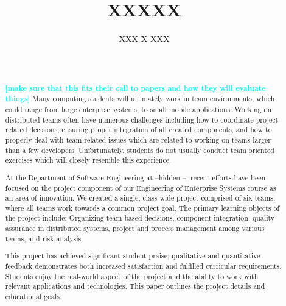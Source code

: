 \documentclass{sig-alternate-05-2015}
\newcommand{\todo}[1]{\textcolor{cyan}{\textbf{[#1]}}}
\newif\ifisnopii
\begin{document}
	
\title{XXXXX}

\ifisnopii %
\author{
\alignauthor
Daniel E. Krutz, and Samuel A. Malachowsky 	\\
	\affaddr{Software Engineering Department}\\
       	\affaddr{Rochester Institute of Technology}\\
	\affaddr{1 Lomb Memorial Drive}\\
	\affaddr{Rochester, NY, USA}\\
       \email{\{dxkvse,samvse\}@rit.edu}
       \alignauthor
} %
\else %
\author{
\alignauthor
XXX X XXX\\
       \\
       \\
}
\fi %





\maketitle
\begin{abstract}

\todo{make sure that this fits their call to papers and how they will evaluate things}
Many computing students will ultimately work in team environments, which could range from large enterprise systems, to small mobile applications. Working on distributed teams often have numerous challenges including how to coordinate project related decisions, ensuring proper integration of all created components, and how to properly deal with team related issues which are related to working on teams larger than a few developers. Unfortunately, students do not usually conduct team oriented exercises which will closely resemble this experience.

At the Department of Software Engineering at \ifisnopii the Rochester Institute of Technology (RIT)\else --hidden --\fi, recent efforts have been focused on the project component of our Engineering of Enterprise Systems course as an area of innovation. We created a single, class wide project comprised of six teams, where all teams work towards a common project goal. The primary learning objects of the project include: Organizing team based decisions, component integration, quality assurance in distributed systems, project and process management among various teams, and risk analysis. 


This project has achieved significant student praise; qualitative and quantitative feedback demonstrates both increased satisfaction and fulfilled curricular requirements. Students enjoy the real-world aspect of the project and the ability to work with relevant applications and technologies. This paper outlines the project details and educational goals.



\end{abstract}
\end{document}
